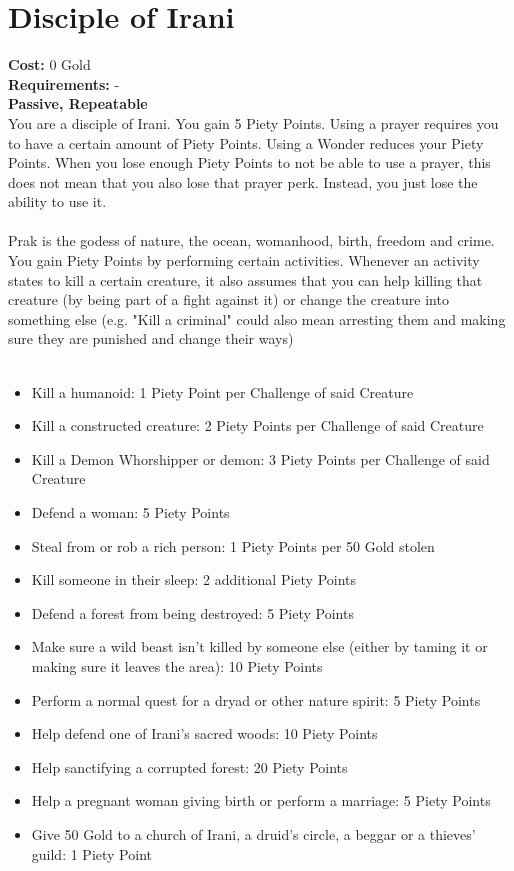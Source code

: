 \section*{Disciple of Irani}
\textbf{Cost:} 0 Gold\\
\textbf{Requirements:} - \\
\textbf{Passive, Repeatable}\\
You are a disciple of Irani. You gain 5 Piety Points. Using a prayer requires you to have a certain amount of Piety Points. Using a Wonder reduces your Piety Points. When you lose enough Piety Points to not be able to use a prayer, this does not mean that you also lose that prayer perk. Instead, you just lose the ability to use it.\\
\\
Prak is the godess of nature, the ocean, womanhood, birth, freedom and crime. You gain Piety Points by performing certain activities. Whenever an activity states to kill a certain creature, it also assumes that you can help killing that creature (by being part of a fight against it) or change the creature into something else (e.g. "Kill a criminal" could also mean arresting them and making sure they are punished and change their ways)\\
\\
\begin{itemize}
	\item Kill a humanoid: 1 Piety Point per Challenge of said Creature
	\item Kill a constructed creature: 2 Piety Points per Challenge of said Creature
	\item Kill a Demon Whorshipper or demon: 3 Piety Points per Challenge of said Creature
	\item Defend a woman: 5 Piety Points
	\item Steal from or rob a rich person: 1 Piety Points per 50 Gold stolen
	\item Kill someone in their sleep: 2 additional Piety Points
	\item Defend a forest from being destroyed: 5 Piety Points
	\item Make sure a wild beast isn't killed by someone else (either by taming it or making sure it leaves the area): 10 Piety Points
	\item Perform a normal quest for a dryad or other nature spirit: 5 Piety Points
	\item Help defend one of Irani's sacred woods: 10 Piety Points
	\item Help sanctifying a corrupted forest: 20 Piety Points
	\item Help a pregnant woman giving birth or perform a marriage: 5 Piety Points
	\item Give 50 Gold to a church of Irani, a druid's circle, a beggar or a thieves' guild: 1 Piety Point
\end{itemize}

